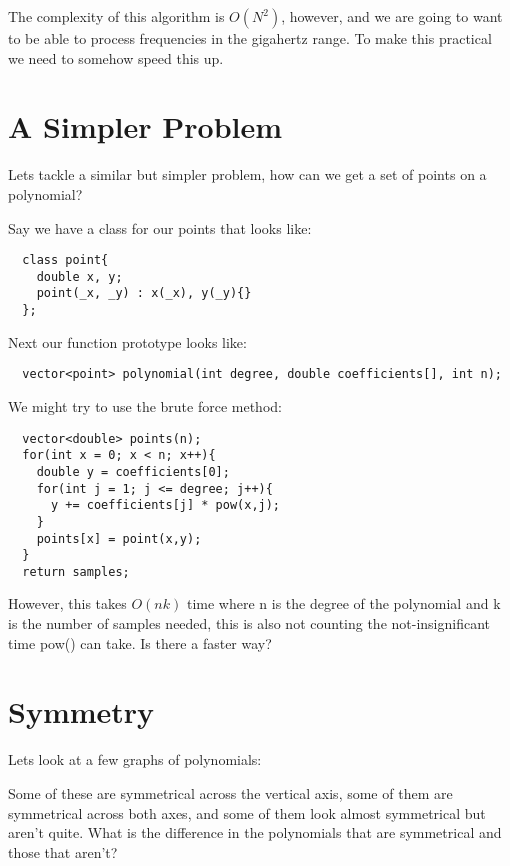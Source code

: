 \documentclass[12pt]{article}
\begin{document}
The complexity of this algorithm is $O(N^2)$, however, and we are going to want to be able to process frequencies in the gigahertz range. To make this practical we need to somehow speed this up.

\pagebreak

\section{A Simpler Problem}
Lets tackle a similar but simpler problem, how can we get a set of points on a polynomial?

Say we have a class for our points that looks like:
\begin{lstlisting}
  class point{
    double x, y;
    point(_x, _y) : x(_x), y(_y){}
  };
\end{lstlisting}

Next our function prototype looks like:
\begin{lstlisting}
  vector<point> polynomial(int degree, double coefficients[], int n);
\end{lstlisting}

We might try to use the brute force method:
\begin{lstlisting}
  vector<double> points(n);
  for(int x = 0; x < n; x++){
    double y = coefficients[0];
    for(int j = 1; j <= degree; j++){
      y += coefficients[j] * pow(x,j);
    }
    points[x] = point(x,y);
  }
  return samples;
\end{lstlisting}
However, this takes $O(nk)$ time where n is the degree of the polynomial and k is the number of samples needed, this is also not counting the not-insignificant time pow() can take. Is there a faster way?

\section{Symmetry}
Lets look at a few graphs of polynomials:

\begin{multicols}{2}


\end{multicols}

Some of these are symmetrical across the vertical axis, some of them are symmetrical across both axes, and some of them look almost symmetrical but aren't quite. What is the difference in the polynomials that are symmetrical and those that aren't?
\end{document}
